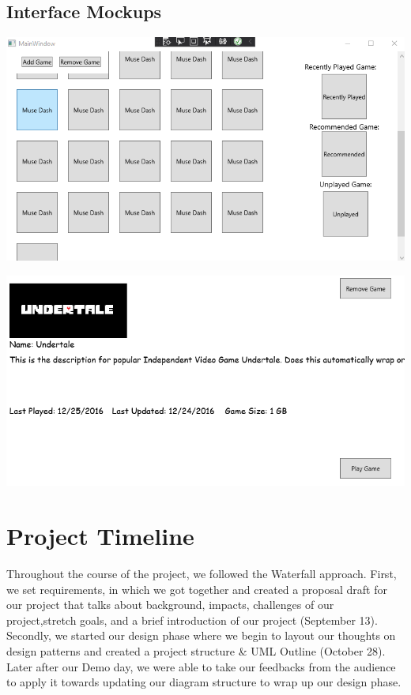 \documentclass[10pt,conference,onecolumn,compsoc]{IEEEtran}
\begin{document}
\subsection{Interface Mockups}
\includegraphics[width=6in]{mainwindow_final.png}

\includegraphics[width=6in]{gamewindow.png}
\section{Project Timeline}
Throughout the course of the project, we followed the Waterfall approach. First, we set requirements, in which we got together and created a proposal draft for our project that talks about background, impacts, challenges of our project,stretch goals, and a brief introduction of our project (September 13). Secondly, we started our design phase where we begin to layout our thoughts on design patterns and created a project structure & UML Outline (October 28). Later after our Demo day, we were able to take our feedbacks from the audience to apply it towards updating our diagram structure to wrap up our design phase.

%
\end{document}
